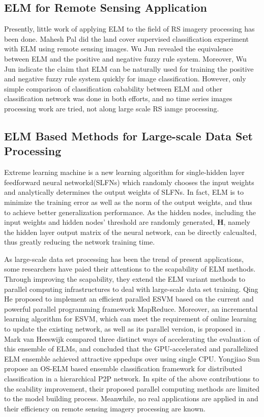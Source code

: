 \documentclass{elsart}
\begin{document}
\subsection{ELM for Remote Sensing Application}
Presently, little work of applying ELM to the field of RS imagery processing has been done. 
Mahesh Pal\cite{Pal2008} did the land cover supervised classification experiment with ELM using remote sensing images.
Wu Jun\cite{Jun2011} revealed the equivalence between ELM and the positive and negative fuzzy rule system. 
Moreover, Wu Jun indicate the claim that ELM can be naturally used for training the positive and negative fuzzy rule system quickly for image classification.
However, only simple comparison of classification cabability between ELM and other classification network was done in both efforts, and no time series images processing work are tried, not along large scale RS iamge processing.


\subsection{ELM Based Methods for Large-scale Data Set Processing}
Extreme learning machine is a new learning algorithm for single-hidden layer feedforward neural networkd(SLFNs) which randomly chooses the input weights and analytically determines the output weights of SLFNs\cite{Huang2004}.
In fact, ELM is to minimize the training error as well as the norm of the output weights\cite{Huang2004}\cite{Huang2006a}, and thus to achieve better generalization performance.
As the hidden nodes, including the input weights and hidden nodes' threshold are randomly generated, $\mathbf{H}$, namely the hidden layer output matrix of the neural network\cite{Huang2003}\cite{Huang1998}, can be directly calcualted, thus greatly reducing the network training time.
\par

As large-scale data set processing has been the trend of present applications, some researchers have paied their attentions to the scapability of ELM methods.
Through improving the scapability, they extend the ELM variant methods to parallel computing infrastructures to deal with large-scale data set training.
Qing He\cite{He2011} proposed to implement an efficient paralled ESVM based on the current and powerful parallel programming framework MapReduce.
Moreover, an incremental learning algorithm for ESVM, which can meet the requirement of online learning to update the existing network, as well as its parallel version, is proposed in \cite{He2011}.
Mark van Heeswijk\cite{Heeswijk2011} compared three distinct ways of accelerating the evaluation of this ensemble of ELMs, and concluded that the GPU-accelerated and parallelized ELM ensemble achieved attractive sppedups over using single CPU.
Yongjiao Sun\cite{Heeswijk2011} propose an OS-ELM based ensemble classification framework for distributed classification in a hierarchical P2P network.
In spite of the above contributions to the scability improvement, their proposed parallel computing methods are limited to the model building process.
Meanwhile, no real applications are applied in and their efficiency on remote sensing imagery processing are known.
\end{document}

